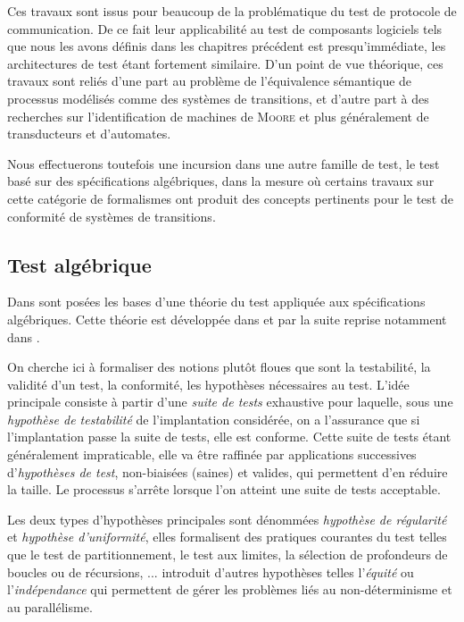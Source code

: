 Ces travaux sont issus pour beaucoup de la probl\'ematique du test de
protocole de communication. De ce fait leur applicabilit\'e au test
de composants logiciels tels que nous les avons d\'efinis dans les
chapitres pr\'ec\'edent est presqu'imm\'ediate, les architectures de test \'etant fortement similaire. D'un point de vue
th\'eorique, ces travaux sont reli\'es d'une part au probl\`eme de
l'\'equivalence s\'emantique de processus mod\'elis\'es comme des
syst\`emes de transitions, et d'autre part \`a des recherches  sur
l'identification  de machines de 
\textsc{Moore} et plus g\'en\'eralement de transducteurs et  d'automates.

Nous effectuerons toutefois une incursion dans une autre famille de
test, le test bas\'e sur des sp\'ecifications alg\'ebriques, dans
la mesure o\`u certains travaux sur cette cat\'egorie de formalismes
ont produit des concepts pertinents pour le test de conformit\'e de
syst\`emes de transitions.

\subsection{Test alg\'ebrique}

Dans \cite{gaudel} sont  pos\'ees les bases d'une th\'eorie du
test  appliqu\'ee aux sp\'ecifications alg\'ebriques. Cette th\'eorie
est d\'evelopp\'ee dans \cite{thmarre} et par la suite reprise
notamment dans \cite{thspectest,formspectest,reqtottest,testsel,testiodata}.

On cherche ici \`a formaliser des notions
plut\^ot floues que sont la testabilit\'e, la validit\'e d'un test,
la conformit\'e, les hypoth\`eses n\'ecessaires au test. L'id\'ee
principale consiste \`a partir d'une \emph{suite de tests} exhaustive
 pour laquelle, sous une \emph{hypoth\`ese
  de testabilit\'e} de l'implantation consid\'er\'ee, on a
l'assurance que si l'implantation passe la suite de tests, elle est
conforme. Cette suite de tests \'etant g\'en\'eralement
impraticable, elle va \^etre raffin\'ee par applications successives
d'\emph{hypoth\`eses de test}, non-biais\'ees (saines) et
valides, qui permettent d'en r\'eduire la taille. Le processus s'arr\^ete lorsque l'on atteint une suite de tests
acceptable. 

Les deux types d'hypoth\`eses principales sont d\'enomm\'ees
\emph{hypoth\`ese de r\'egularit\'e} et \emph{hypoth\`ese
  d'uniformit\'e}\cite{gaudel}, elles formalisent des pratiques courantes du test
telles que le test de partitionnement, le test aux limites, la
s\'election de profondeurs de boucles ou de r\'ecursions,
... \cite{thphalippou} introduit d'autres hypoth\`eses
telles l'\emph{\'equit\'e} ou l'\emph{ind\'ependance} qui
permettent de g\'erer les probl\`emes li\'es au non-d\'eterminisme
et au parall\'elisme. 

